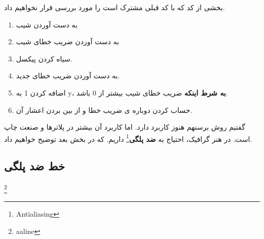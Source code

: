 \documentclass[14pt,a4paper]{memoir}
\begin{document}
	 
	 بخشی از کد که با کد قبلی مشترک است را مورد بررسی قرار نخواهیم داد.
	 
	\begin{enumerate}[label=(\Roman*)]
	\item  به دست آوردن شیب
	\item به دست آوردن ضریب خطای شیب
	\item سیاه کردن پیکسل.
	\item به دست آوردن ضریب خطای جدید.
	\item  اضافه کردن 1 به y، \textbf{به شرط اینکه} ضریب خطای شیب بیشتر از 0 باشد.
	\item  حساب کردن دوباره ی ضریب خطا و از بین بردن اعشار آن.
\end{enumerate}
	 
	 
	 گفتیم روش برسنهم هنوز کاربرد دارد. اما کاربرد آن بیشتر در پلاترها و صنعت چاپ است. در هنر گرافیک، احتیاج به \textbf{ضد پلگی}\footnote{Antialiasing} داریم. که در بخش بعد توضیح خواهیم داد.
	 
	 \subsection{خط ضد پلگی}\footnote{aaline}
	 
	 
	 
	 
\end{document}
